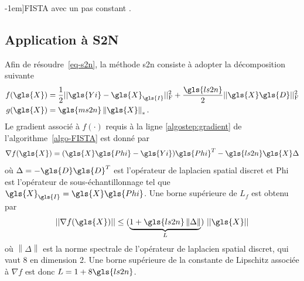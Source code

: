 \begin{algorithme}
    \begin{minipage}{\textwidth}
        \begin{algorithm}[H]
        \end{algorithm}
    \end{minipage}
    \caption[][-1em]{FISTA avec un pas constant \cite{beck_fast_2009}.\protect\label{algo-FISTA}}
\end{algorithme}

\subsection{Application à S2N}

Afin de résoudre~\eqref{eq-s2n}, la méthode \gls{s2n} consiste à adopter la décomposition suivante
\begin{align}
    f(\gls{X}) &= \frac{1}{2}\frobnorm{\gls{Yi}-\gls{X}_{\gls{I}}} + \frac{\gls{ls2n}}{2}\frobnorm{\gls{X} \gls{D}}\\
    g(\gls{X}) &= \gls{ms2n} \left\|\gls{X}\right\|_*.
\end{align}
Le gradient associé à $f(\cdot)$ requis à la ligne \ref{algostep:gradient} de l'algorithme~\ref{algo-FISTA} est donné par
\begin{equation}
    \nabla f(\gls{X}) = (\gls{X}\gls{Phi} - \gls{Yi})\gls{Phi}^T - \gls{ls2n} \gls{X} \Delta
\end{equation}
où $\Delta = -\gls{D}\gls{D}^T$ est l'opérateur de laplacien spatial discret et \gls{Phi} est l'opérateur de sous-échantillonnage tel que $\gls{X}_{\gls{I}} = \gls{X}\gls{Phi}$.
Une borne supérieure de $L_f$ est obtenu par
\begin{equation}
    ||\nabla f(\gls{X})||\leq (\underbrace{1+\gls{ls2n} \left\|\Delta\right\|}_{L})\ ||\gls{X}||
\end{equation}
où $\left\|\Delta\right\|$ est la norme spectrale de l'opérateur de laplacien spatial discret, qui vaut 8 en dimension 2. Une borne supérieure de la constante de Lipschitz associée à $\nabla f$ est donc $L= 1 +8\gls{ls2n}$. 

